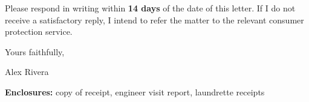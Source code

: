 \documentclass[11pt]{article}
\begin{document}
Please respond in writing within \textbf{14 days} of the date of this letter. If I do not receive a satisfactory reply, I intend to refer the matter to the relevant consumer protection service.

Yours faithfully,

\vspace{0.5em}

Alex Rivera

\vfill
{\small \textbf{Enclosures:} copy of receipt, engineer visit report, laundrette receipts}
\end{document}
